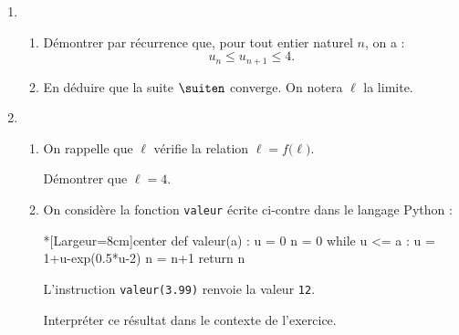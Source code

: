 \begin{enumerate}
	\item 
	\begin{enumerate}
		\item Démontrer par récurrence que, pour tout entier naturel $n$, on a : \[ u_n \leqslant u_{n+1} \leqslant 4.\]
		\item En déduire que la suite $\suiten$ converge. On notera $\ell$ la limite. 
	\end{enumerate}
	\item 
	\begin{enumerate}
		\item On rappelle que $\ell$ vérifie la relation $\ell=f\big(\ell\big)$.
		
		Démontrer que $\ell=4$.
		\item On considère la fonction \texttt{valeur} écrite ci-contre dans le langage \textsf{Python} :
		
\begin{CodePythonLstAlt}*[Largeur=8cm]{center}
def valeur(a) :
	u = 0
	n = 0
	while u <= a :
		u = 1+u-exp(0.5*u-2)
		n = n+1
	return n
\end{CodePythonLstAlt}
		
		L'instruction \texttt{valeur(3.99)} renvoie la valeur \texttt{12}.
		
		Interpréter ce résultat dans le contexte de l'exercice.
	\end{enumerate}
\end{enumerate}

